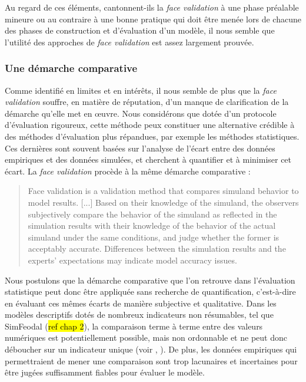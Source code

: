 Au regard de ces éléments, cantonnent-ils la \textit{face validation} à une phase préalable mineure ou au contraire à une bonne pratique qui doit être menée lors de chacune des phases de construction et d'évaluation d'un modèle, il nous semble que l'utilité des approches de \textit{face validation} est assez largement prouvée.

\subsubsection{Une démarche comparative}
Comme identifié en limites et en intérêts, il nous semble de plus que la \textit{face validation} souffre, en matière de réputation, d'un manque de clarification de la démarche qu'elle met en œuvre.
Nous considérons que dotée d'un protocole d'évaluation rigoureux, cette méthode peux constituer une alternative crédible à des méthodes d'évaluation plus répandues, par exemple les méthodes statistiques.
Ces dernières sont souvent basées sur l'analyse de l'écart entre des données empiriques et des données simulées, et cherchent à quantifier et à minimiser cet écart.
La \textit{face validation} procède à la même démarche comparative :
\begin{quotation}
		\noindent \og Face validation is a validation method that compares simuland behavior to model results. [...] Based on their knowledge of the simuland, the observers subjectively compare the behavior of the simuland as reflected in the simulation results with their knowledge of the behavior of the actual simuland under the same conditions, and judge whether the former is acceptably accurate. Differences between the simulation results and the experts' expectations may indicate model accuracy issues.
	\mbox{}~ \hfill \textcite[341]{petty2010verification}
\end{quotation}
Nous postulons que la démarche comparative que l'on retrouve dans l'évaluation statistique peut donc être appliquée sans recherche de quantification, c'est-à-dire en évaluant ces mêmes écarts de manière subjective et qualitative.
Dans les modèles descriptifs dotés de nombreux indicateurs non résumables, tel que SimFeodal (\hl{ref chap 2}), la comparaison terme à terme entre des valeurs numériques est potentiellement possible, mais non ordonnable et ne peut donc déboucher sur un indicateur unique (voir , ).
De plus, les données empiriques qui permettraient de mener une comparaison sont trop lacunaires et incertaines pour être jugées suffisamment fiables pour évaluer le modèle.

